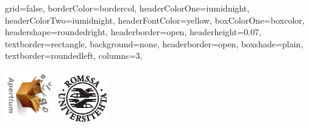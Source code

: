 \documentclass[fontscale=0.35,landscape,paperwidth=841mm,paperheight=1189mm]{baposter}  %
\begin{document}
	\setlength{\pdfpageheight}{\paperheight}
	\setlength{\pdfpagewidth}{\paperwidth}


	\begin{poster}{
		grid=false,
		borderColor=bordercol,
		headerColorOne=iumidnight,
		headerColorTwo=iumidnight,
		headerFontColor=yellow,
		boxColorOne=boxcolor,
		headershape=roundedright,
		headerborder=open,
		headerheight=0.07\textheight,
		textborder=rectangle,
		background=none,
		headerborder=open,
		boxshade=plain,
		textborder=roundedleft,
		columns=3,
	}{ %
		\setlength\fboxsep{0.5em}
		\setlength\fboxrule{0pt}
		\includegraphics[angle=90,height=6.2em]{apertium5b}%
		\includegraphics[height=5.8em]{uitlogo}\hspace{1em}

}
\end{poster}
\end{document}
